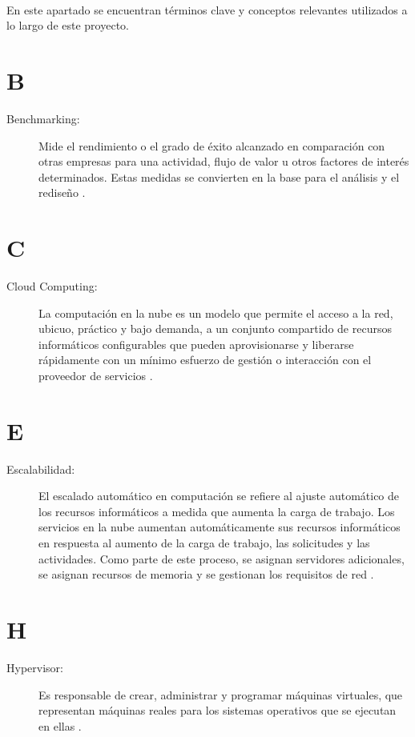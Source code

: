 \label{cap:glosario}
\mbox{}\\
En este apartado se encuentran términos clave y conceptos relevantes utilizados a lo largo de este proyecto.

\section*{B}
\begin{description}
  \item[Benchmarking:] Mide el rendimiento o el grado de éxito alcanzado en comparación con otras empresas para una actividad, flujo de valor u otros factores de interés determinados. Estas medidas se convierten en la base para el análisis y el rediseño \citep{PeterWootton2024}.
\end{description}

\section*{C}
\begin{description}
  \item[Cloud Computing:] La computación en la nube es un modelo que permite el acceso a la red, ubicuo, práctico y bajo demanda, a un conjunto compartido de recursos informáticos configurables que pueden aprovisionarse y liberarse rápidamente con un mínimo esfuerzo de gestión o interacción con el proveedor de servicios \citep{Mell2011}.
\end{description}

\section*{E}
\begin{description}
  \item[Escalabilidad:] El escalado automático en computación se refiere al ajuste automático de los recursos informáticos a medida que aumenta la carga de trabajo. Los servicios en la nube aumentan automáticamente sus recursos informáticos en respuesta al aumento de la carga de trabajo, las solicitudes y las actividades. Como parte de este proceso, se asignan servidores adicionales, se asignan recursos de memoria y se gestionan los requisitos de red \citep{TARI2024100650}.
\end{description}

\section*{H}
\begin{description}
  \item[Hypervisor:] Es responsable de crear, administrar y programar máquinas virtuales, que representan máquinas reales para los sistemas operativos que se ejecutan en ellas \citep{Cinque2024}.
\end{description}

